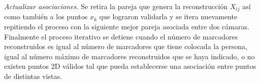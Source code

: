 \textit{Actualizar asociaciones.}\label{actualizar_asociaciones}
Se retira la pareja que genera la reconstrucción $X_{ij}$ así como también a los puntos $x_k$ que lograron validarla y se itera nuevamente repitiendo el proceso con la siguiente mejor pareja asociada entre dos cámaras.
%
Finalmente el proceso iterativo se detiene cuando el número de marcadores reconstruidos es igual al número de marcadores que tiene colocada la persona, igual al número máximo de marcadores reconstruidos que se haya indicado, o no existen puntos 2D válidos tal que pueda establecerse una asociación entre puntos de distintas vistas.